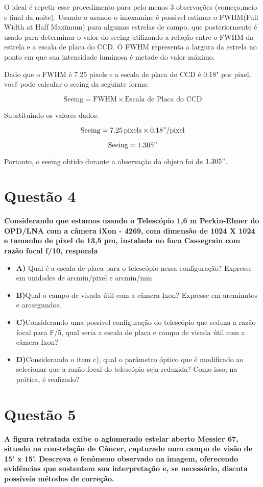 \documentclass[a4paper, 12pt]{article}
\begin{document}
O ideal é repetir esse procedimento para pelo menos 3
observações (começo,meio e final da noite).
Usando o usando o imexamine é possivel estimar o FWHM(Full Width at Half Maximum) para algumas estrelas de campo, que posteriormente é usado para determinar o valor do seeing utilizando a relação entre o FWHM  da estrela e a escala de placa do CCD. O FWHM representa a largura da estrela no ponto em que sua intensidade luminosa é metade do valor máximo.

Dado que o FWHM é 7.25 pixels e a escala de placa do CCD é 0.18" por pixel, você pode calcular o seeing da seguinte forma:

\[
\text{Seeing} = \text{FWHM} \times \text{Escala de Placa do CCD}
\]

Substituindo os valores dados:

\[
\text{Seeing} = 7.25 \, \text{pixels} \times 0.18" /\text{pixel}
\]

\[
\text{Seeing} = 1.305"
\]

Portanto, o seeing obtido durante a observação do objeto foi de $1.305"$.


\section*{Questão 4}
\noindent \textbf{Considerando que estamos usando o Telescópio 1,6 m Perkin-Elmer do OPD/LNA com a câmera iXon - 4269, com dimensão de 1024 X 1024 e tamanho de pixel de 13,5 µm, instalada no foco Cassegrain com razão focal f/10, responda} \\
\begin{itemize}
    \item \textbf{A)} Qual é a escala de placa para o telescópio nessa configuração? Expresse em unidades de arcmin/pixel e arcmin/mm
    \item \textbf{B)}Qual o campo de visada útil com a câmera Ixon? Expresse em arcminutos e arcsegundos.
    \item \textbf{C)}Considerando uma possível configuração do telescópio que reduza a razão focal para F/5, qual seria a escala de placa e campo de visada útil com a câmera Ixon?
    \item \textbf{D)}Considerando o item c), qual o parâmetro óptico que é modificado ao selecionar que a razão focal do telescópio seja reduzida? Como isso, na prática, é realizado?
\end{itemize}

\section*{Questão 5}
\noindent \textbf{A figura retratada exibe o aglomerado estelar aberto Messier 67, situado na constelação de Câncer, capturado num campo de visão de 15' x 15'. Descreva o fenômeno observado na imagem, oferecendo evidências que sustentem sua interpretação e, se necessário, discuta possíveis métodos de correção.} \\
\end{document}
